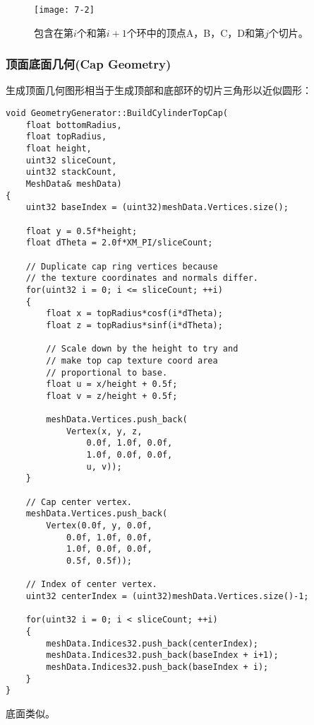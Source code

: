 \begin{figure}[h]
    \texttt{[image: 7-2]}
    \centering
    \caption{包含在第$i$个和第$i + 1$个环中的顶点A，B，C，D和第$j$个切片。}
    \label{fig:7-2}
\end{figure}
\clearpage

\subsubsection{顶面底面几何(Cap Geometry)}
\begin{flushleft}
生成顶面几何图形相当于生成顶部和底部环的切片三角形以近似圆形：\\
\end{flushleft}
\begin{lstlisting}
void GeometryGenerator::BuildCylinderTopCap(
    float bottomRadius, 
    float topRadius, 
    float height,
    uint32 sliceCount, 
    uint32 stackCount, 
    MeshData& meshData)
{
    uint32 baseIndex = (uint32)meshData.Vertices.size();

    float y = 0.5f*height;
    float dTheta = 2.0f*XM_PI/sliceCount;

    // Duplicate cap ring vertices because 
    // the texture coordinates and normals differ.
    for(uint32 i = 0; i <= sliceCount; ++i)
    {
        float x = topRadius*cosf(i*dTheta);
        float z = topRadius*sinf(i*dTheta);

        // Scale down by the height to try and 
        // make top cap texture coord area
        // proportional to base.
        float u = x/height + 0.5f;
        float v = z/height + 0.5f;

        meshData.Vertices.push_back(
            Vertex(x, y, z, 
                0.0f, 1.0f, 0.0f, 
                1.0f, 0.0f, 0.0f, 
                u, v));
    }

    // Cap center vertex.
    meshData.Vertices.push_back(
        Vertex(0.0f, y, 0.0f, 
            0.0f, 1.0f, 0.0f, 
            1.0f, 0.0f, 0.0f, 
            0.5f, 0.5f));

    // Index of center vertex.
    uint32 centerIndex = (uint32)meshData.Vertices.size()-1;

    for(uint32 i = 0; i < sliceCount; ++i)
    {
        meshData.Indices32.push_back(centerIndex);
        meshData.Indices32.push_back(baseIndex + i+1);
        meshData.Indices32.push_back(baseIndex + i);
    }
}
\end{lstlisting}
\begin{flushleft}
底面类似。\\
\end{flushleft}

